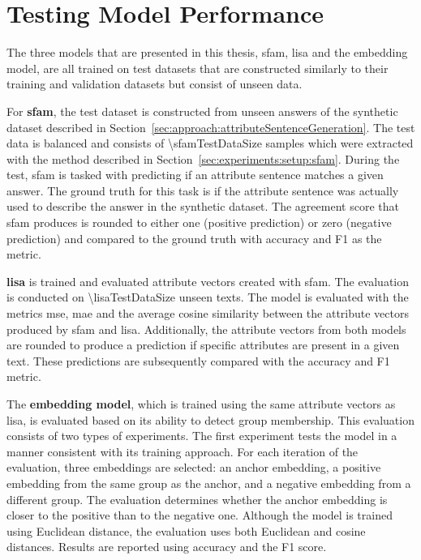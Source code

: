 \section{Testing Model Performance}
\label{sec:experiments:models}
The three models that are presented in this thesis, \ac{sfam}, \ac{lisa} and the embedding model, are all trained on test datasets that are constructed similarly to their training and validation datasets but consist of unseen data.

For \textbf{\ac{sfam}}, the test dataset is constructed from unseen answers of the synthetic dataset described in Section~\ref{sec:approach:attributeSentenceGeneration}. The test data is balanced and consists of \num{\sfamTestDataSize} samples which were extracted with the method described in Section~\ref{sec:experiments:setup:sfam}.
During the test, \ac{sfam} is tasked with predicting if an attribute sentence matches a given answer. The ground truth for this task is if the attribute sentence was actually used to describe the answer in the synthetic dataset. The agreement score that \ac{sfam} produces is rounded to either one (positive prediction) or zero (negative prediction) and compared to the ground truth with accuracy and F1 as the metric.

\textbf{\ac{lisa}} is trained and evaluated attribute vectors created with \ac{sfam}. The evaluation is conducted on \num{\lisaTestDataSize} unseen texts. The model is evaluated with the metrics \ac{mse}, \ac{mae} and the average cosine similarity between the attribute vectors produced by \ac{sfam} and \ac{lisa}. Additionally, the attribute vectors from both models are rounded to produce a prediction if specific attributes are present in a given text. These predictions are subsequently compared with the accuracy and F1 metric.

The \textbf{embedding model}, which is trained using the same attribute vectors as \ac{lisa}, is evaluated based on its ability to detect group membership. This evaluation consists of two types of experiments. The first experiment tests the model in a manner consistent with its training approach. For each iteration of the evaluation, three embeddings are selected: an anchor embedding, a positive embedding from the same group as the anchor, and a negative embedding from a different group. The evaluation determines whether the anchor embedding is closer to the positive than to the negative one. Although the model is trained using Euclidean distance, the evaluation uses both Euclidean and cosine distances. Results are reported using accuracy and the F1 score.

